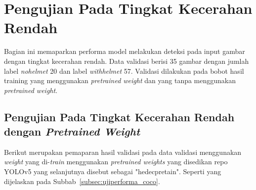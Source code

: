 \newpage
\section{Pengujian Pada Tingkat Kecerahan Rendah}
\label{sec:pengujianberdasarkantingkatkeceharan}

\par Bagian ini memaparkan performa model melakukan
deteksi pada input gambar dengan tingkat kecerahan rendah. Data validasi berisi
35 gambar dengan jumlah label \emph{no\textunderscore helmet} 20 dan label \emph{with\textunderscore helmet} 57.
Validasi dilakukan pada bobot hasil training yang menggunakan \textit{pretrained weight} dan yang tanpa menggunakan \textit{pretrained weight}. 

\subsection{Pengujian Pada Tingkat Kecerahan Rendah dengan \emph{Pretrained Weight}}
\label{subsec:lowlight_pretrained}

\par Berikut merupakan pemaparan hasil validasi pada data validasi menggunakan \emph{weight} yang di-\emph{train} menggunakan
\emph{pretrained weights} yang disedikan repo YOLOv5 yang selanjutnya disebut sebagai "hedec\textunderscore pretain". 
Seperti yang dijelaskan pada Subbab~\ref{subsec:ujiperforma_coco}. 



